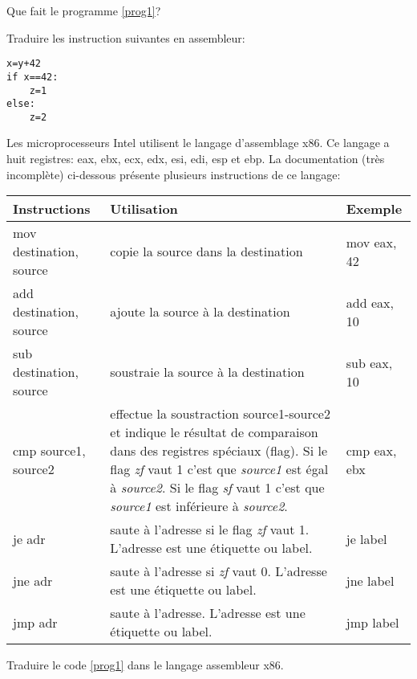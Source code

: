 \documentclass[a4paper,11pt]{article}
\begin{document}
\begin{Form}
\begin{exo}
Que fait le programme \ref{prog1}?

\end{exo}
\begin{exo}
Traduire les instruction suivantes en assembleur:
\begin{lstlisting}
x=y+42
if x==42:
    z=1
else:
    z=2
\end{lstlisting}
\end{exo}
\begin{exo}
Les microprocesseurs Intel utilisent le langage d'assemblage x86. Ce langage a huit registres: eax, ebx, ecx, edx, esi, edi, esp et ebp. La documentation (très incomplète) ci-dessous présente plusieurs instructions de ce langage:
\begin{center}
\begin{tabular}{|*{3}{>{\centering\arraybackslash}m{}|}}
\hline 
Instructions & Utilisation & Exemple \\ 
\hline 
mov destination, source & copie la source dans la destination & mov eax, 42 \\ 
\hline 
add destination, source & ajoute la source à la destination & add eax, 10 \\ 
\hline 
sub destination, source & soustraie la source à la destination & sub eax, 10 \\ 
\hline 
cmp source1, source2 & effectue la soustraction source1-source2 et indique le résultat de comparaison dans des registres spéciaux (flag). Si le flag \emph{zf} vaut 1 c'est que \emph{source1} est égal à \emph{source2}. Si le flag \emph{sf} vaut 1 c'est que \emph{source1} est inférieure à \emph{source2}. & cmp eax, ebx \\ 
\hline 
je adr & saute à l'adresse si le flag \emph{zf} vaut 1. L'adresse est une étiquette ou label. & je label \\ 
\hline 
jne adr & saute à l'adresse si \emph{zf} vaut 0. L'adresse est une étiquette ou label. & jne label \\ 
\hline 
jmp adr & saute à l'adresse. L'adresse est une étiquette ou label. & jmp label \\ 
\hline 
\end{tabular} 
\end{center}
Traduire le code \ref{prog1} dans le langage assembleur x86.
\end{exo}
\end{Form}
\end{document}
